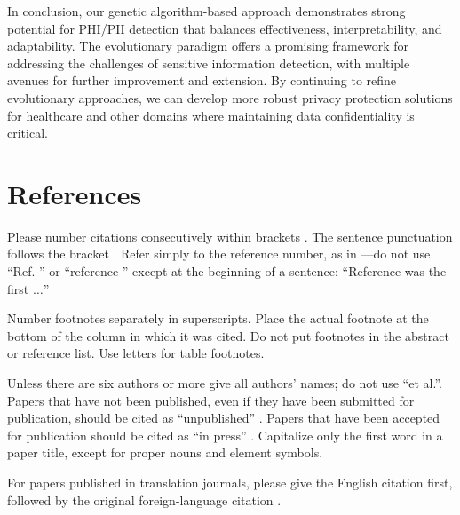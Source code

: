 \documentclass[conference]{IEEEtran}
\begin{document}
In conclusion, our genetic algorithm-based approach demonstrates strong potential for PHI/PII detection that balances effectiveness, interpretability, and adaptability. The evolutionary paradigm offers a promising framework for addressing the challenges of sensitive information detection, with multiple avenues for further improvement and extension. By continuing to refine evolutionary approaches, we can develop more robust privacy protection solutions for healthcare and other domains where maintaining data confidentiality is critical.

\section*{References}

Please number citations consecutively within brackets \cite{b1}. The
sentence punctuation follows the bracket \cite{b2}. Refer simply to the reference
number, as in \cite{b3}---do not use ``Ref. \cite{b3}'' or ``reference \cite{b3}'' except at
the beginning of a sentence: ``Reference \cite{b3} was the first $\ldots$''

Number footnotes separately in superscripts. Place the actual footnote at
the bottom of the column in which it was cited. Do not put footnotes in the
abstract or reference list. Use letters for table footnotes.

Unless there are six authors or more give all authors' names; do not use
``et al.''. Papers that have not been published, even if they have been
submitted for publication, should be cited as ``unpublished'' \cite{b4}. Papers
that have been accepted for publication should be cited as ``in press'' \cite{b5}.
Capitalize only the first word in a paper title, except for proper nouns and
element symbols.

For papers published in translation journals, please give the English
citation first, followed by the original foreign-language citation \cite{b6}.
\end{document}
